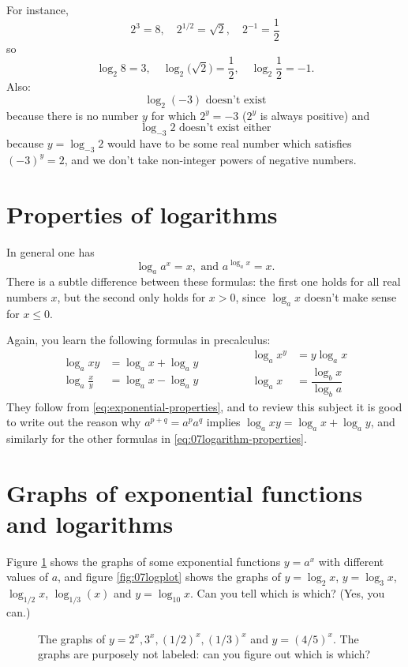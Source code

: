 For instance, 
\[
2^3 = 8, \quad
2^{1/2} = \sqrt2,\quad
2^{-1}= \frac12
\]
so
\[
\log_2 8 = 3,\quad
\log_2\bigl(\surd2\bigr) = \frac12,\quad
\log_2 \frac12 = -1.
\]
Also:
\[
\log_2 (-3) \text{ doesn't exist}
\]
because there is no number $y$ for which $2^y = -3$ ($2^y$ is always positive)
and
\[
\log_{-3}2 \text{ doesn't exist either}
\]
because $y=\log_{-3}2$ would have to be some real number which satisfies $(-3)^y
= 2$, and we don't take non-integer powers of negative numbers.



\section{Properties of logarithms}
In general one has
\[
\log_a a^x = x,  \text{ and }  a^{\log_a x}=x.
\]
There is a subtle difference between these formulas: the first one holds for all
real numbers $x$, but the second only holds for $x>0$, since $\log _a x$ doesn't
make sense for $x\leq 0$. 

Again, you learn the following formulas in precalculus:
\begin{equation}
  \begin{aligned}
    \log_a xy &= \log_a x + \log _a y \\
    \log_a \frac xy &= \log_ax-\log_a y
  \end{aligned}
  \qquad\qquad
  \begin{aligned}
    \log_a x^y &= y\log_a x \\
    \log_a x &= \dfrac{\log_b x}{\log_b a}
  \end{aligned}
  \label{eq:07logarithm-properties}
\end{equation}
They follow from \eqref{eq:exponential-properties}, and to review this
subject it is good to write out the reason why $a^{p+q} = a^p a^q$
implies $\log_a xy = \log_a x + \log_a y$, and similarly for the other
formulas in \eqref{eq:07logarithm-properties}.

\section{Graphs of exponential functions and logarithms}
Figure \ref{fig:07expplot} shows the graphs of some exponential
functions $y=a^x$ with different values of $a$, and figure
\ref{fig:07logplot} shows the graphs of $y=\log_2 x$, $y=\log_3 x$,
$\log_{1/2}x$, $\log_{1/3}(x)$ and $y=\log_{10}x$. Can you tell which
is which? (Yes, you can.)

\begin{figure}[t]\centering
  
  \caption{The graphs of $y=2^x, 3^x, (1/2)^x, (1/3)^x$ and $y=(4/5)^x$.
    The graphs are purposely not labeled: can you figure out which is which?}
  \label{fig:07expplot}
\end{figure}

